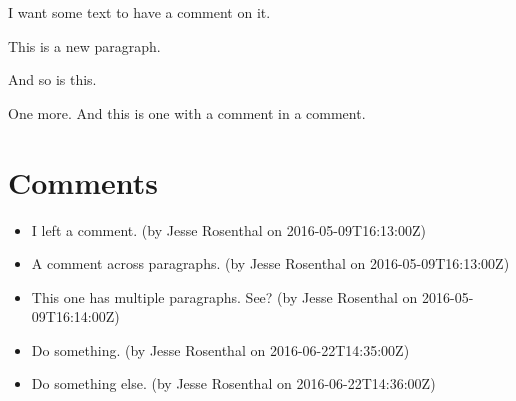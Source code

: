 \documentclass{article}
\begin{document}
I want some text to have a comment on it.

This is a new paragraph.

And so is this.

One more. And this is one with a comment in a comment.

\section*{Comments}
\begin{itemize}
\item I left a comment. (by Jesse Rosenthal on 2016-05-09T16:13:00Z)
\item A comment across paragraphs. (by Jesse Rosenthal on 2016-05-09T16:13:00Z)
\item This one has multiple paragraphs. See? (by Jesse Rosenthal on 2016-05-09T16:14:00Z)
\item Do something. (by Jesse Rosenthal on 2016-06-22T14:35:00Z)
\item Do something else. (by Jesse Rosenthal on 2016-06-22T14:36:00Z)
\end{itemize}
\end{document}
